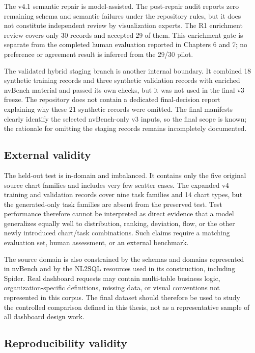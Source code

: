 The v4.1 semantic repair is model-assisted. The post-repair audit reports zero remaining schema and semantic failures under the repository rules, but it does not constitute independent review by visualization experts. The R1 enrichment review covers only 30 records and accepted 29 of them. This enrichment gate is separate from the completed human evaluation reported in Chapters 6 and 7; no preference or agreement result is inferred from the 29/30 pilot.

The validated hybrid staging branch is another internal boundary. It combined 18 synthetic training records and three synthetic validation records with enriched nvBench material and passed its own checks, but it was not used in the final v3 freeze. The repository does not contain a dedicated final-decision report explaining why these 21 synthetic records were omitted. The final manifests clearly identify the selected nvBench-only v3 inputs, so the final scope is known; the rationale for omitting the staging records remains incompletely documented.

\subsection{External validity}

The held-out test is in-domain and imbalanced. It contains only the five original source chart families and includes very few scatter cases. The expanded v4 training and validation records cover nine task families and 14 chart types, but the generated-only task families are absent from the preserved test. Test performance therefore cannot be interpreted as direct evidence that a model generalizes equally well to distribution, ranking, deviation, flow, or the other newly introduced chart/task combinations. Such claims require a matching evaluation set, human assessment, or an external benchmark.

The source domain is also constrained by the schemas and domains represented in nvBench and by the NL2SQL resources used in its construction, including Spider. Real dashboard requests may contain multi-table business logic, organization-specific definitions, missing data, or visual conventions not represented in this corpus. The final dataset should therefore be used to study the controlled comparison defined in this thesis, not as a representative sample of all dashboard design work.

\subsection{Reproducibility validity}

